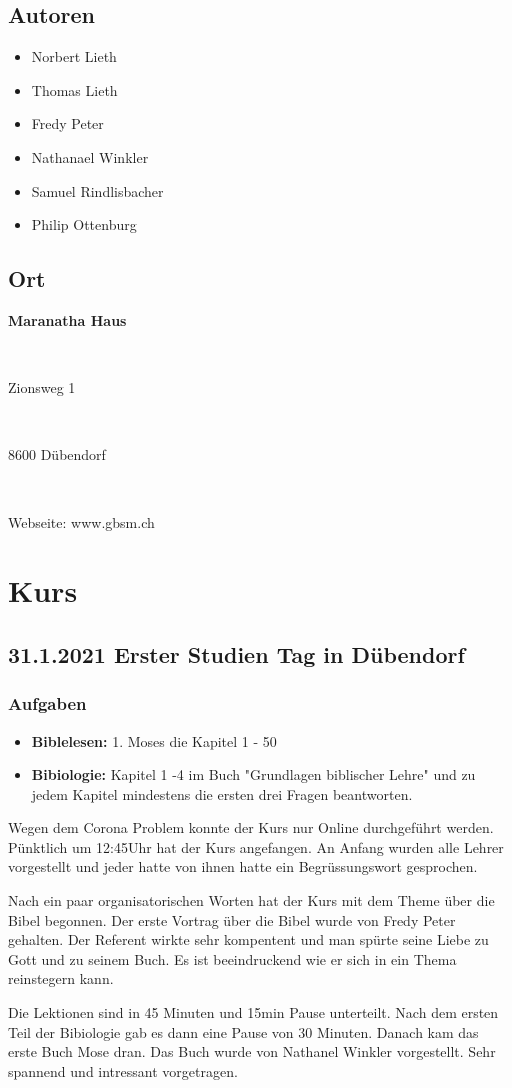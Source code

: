 \subsection{Autoren}
\begin{itemize}
    \item Norbert Lieth
    \item Thomas Lieth
    \item Fredy Peter
    \item Nathanael Winkler
    \item Samuel Rindlisbacher
    \item Philip Ottenburg 
\end{itemize}
\subsection{Ort}
\parbox{3.5in}{\textbf{Maranatha Haus}}\\
\parbox{3.5in}{Zionsweg 1} \\
\parbox{3.5in}{8600 Dübendorf} \\
\parbox{3.5in}{Webseite: www.gbsm.ch}
\newpage
\section{Kurs}
\subsection{31.1.2021 Erster Studien Tag in Dübendorf}
\subsubsection{Aufgaben}
\begin{itemize}
    \item \textbf{Biblelesen:} 1. Moses die Kapitel 1 - 50
    \item \textbf{Bibiologie:} Kapitel 1 -4 im Buch "Grundlagen biblischer Lehre" 
    \cite{bibli:1} und zu jedem Kapitel mindestens die ersten drei Fragen beantworten. 
\end{itemize}
Wegen dem Corona Problem konnte der Kurs nur Online durchgeführt werden. Pünktlich um 12:45Uhr hat der Kurs angefangen. An Anfang wurden alle Lehrer vorgestellt und jeder hatte von ihnen hatte ein Begrüssungswort gesprochen. 

Nach ein paar organisatorischen Worten hat der Kurs mit dem Theme über die Bibel begonnen. Der erste Vortrag über die Bibel wurde von Fredy Peter gehalten. Der Referent wirkte sehr kompentent und man spürte seine Liebe zu Gott und zu seinem Buch. Es ist beeindruckend wie er sich in ein Thema reinstegern kann.

Die Lektionen sind in 45 Minuten und 15min Pause unterteilt. Nach dem ersten Teil der Bibiologie gab es dann eine Pause von 30 Minuten. Danach kam das erste Buch Mose dran. Das Buch wurde von Nathanel Winkler vorgestellt. Sehr spannend und intressant vorgetragen.